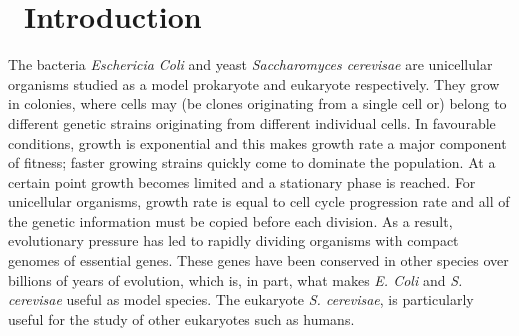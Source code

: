 \graphicspath{{images/}}

\section{\thesection~Introduction}
\label{sec:introduction}





The bacteria \textit{Eschericia Coli} and yeast \textit{Saccharomyces
  cerevisae} are unicellular organisms studied as a model prokaryote
and eukaryote respectively. They grow in colonies, where cells may (be
clones originating from a single cell or) belong to different genetic
strains originating from different individual cells. In favourable
conditions, growth is exponential and this makes growth rate a major
component of fitness; faster growing strains quickly come to dominate
the population. At a certain point growth becomes limited and a
stationary phase is reached. For unicellular organisms, growth rate is
equal to cell cycle progression rate and all of the genetic
information must be copied before each division. As a result,
evolutionary pressure has led to rapidly dividing organisms with
compact genomes of essential genes. These genes have been conserved in
other species over billions of years of evolution, which is, in part,
what makes \textit{E. Coli} and \textit{S.  cerevisae} useful as
model species. The eukaryote \textit{S. cerevisae}, is particularly
useful for the study of other eukaryotes such as humans.

